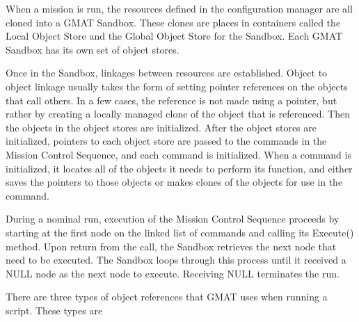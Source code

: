 \documentclass[10pt,letterpaper]{article}
\begin{document}
When a mission is run, the resources defined in the configuration manager are all cloned into a GMAT Sandbox.  These clones are places in containers called the Local Object Store and the Global Object Store for the Sandbox.  Each GMAT Sandbox has its own set of object stores.  

Once in the Sandbox, linkages between resources are established.  Object to object linkage usually takes the form of setting pointer references on the objects that call others.  In a  few cases, the reference is not made using a pointer, but rather by creating a locally managed clone of the object that is referenced.   Then the objects in the object stores are initialized.  After the object stores are initialized, pointers to each object store are passed to the commands in the Mission Control Sequence, and each command is initialized.  When a command is initialized, it locates all of the objects it needs to perform its function, and either saves the pointers to those objects or makes clones of the objects for use in the command.

During a nominal run, execution of the Mission Control Sequence proceeds by starting at the first node on the linked list of commands and calling its Execute() method.  Upon return from the call, the Sandbox retrieves the next node that need to be executed.  The Sandbox loops through this process until it received a NULL node as the next node to execute.  Receiving NULL terminates the run.

There are three types of object references that GMAT uses when running a script.  These types are
\end{document}
